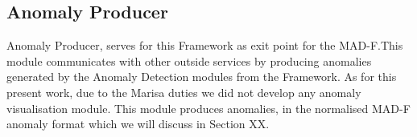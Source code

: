 
\subsection{Anomaly Producer}
Anomaly Producer, serves for this Framework as exit point for the MAD-F.This module communicates with other outside services by producing anomalies generated by the Anomaly Detection modules from the Framework. As for this present work, due to the Marisa duties we did not develop any anomaly visualisation module. This module produces anomalies, in the normalised MAD-F anomaly format which we will discuss in Section XX.
